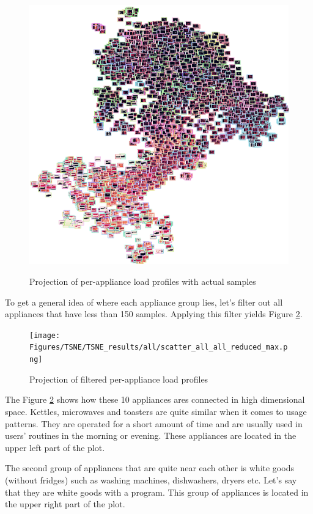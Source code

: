 \begin{figure}[H]
	\centering
	\caption{Projection of per-appliance load profiles with actual samples}
	\includegraphics[width=.9\textwidth]{Figures/TSNE/TSNE_results/all/img_scatter_allall_lgimgs.png}
	\label{fig:tsne_papb_img_scatter_all}
\end{figure}

To get a general idea of where each appliance group lies,
let's filter out all appliances that have less than 150 samples.
Applying this filter yields Figure \ref{fig:tsne_papb_scatter_all_reduced}.

\begin{figure}[H]
	\centering
	\caption{Projection of filtered per-appliance load profiles}
	\texttt{[image: Figures/TSNE/TSNE\_results/all/scatter\_all\_all\_reduced\_max.png]}
	\label{fig:tsne_papb_scatter_all_reduced}
\end{figure}

The Figure \ref{fig:tsne_papb_scatter_all_reduced} shows how these 10 appliances ares connected in high dimensional space.
Kettles, microwaves and toasters are quite similar when it comes to usage patterns.
They are operated for a short amount of time and are usually used in users' routines in the morning or evening.
These appliances are located in the upper left part of the plot.

The second group of appliances that are quite near each other is white
goods (without fridges) such as washing machines, dishwashers, dryers etc.
Let's say that they are white goods with a program. 
This group of appliances is located in the upper right part of the plot.

